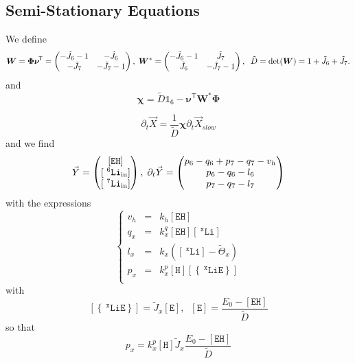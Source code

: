 \documentclass[aps,onecolumn,12pt]{revtex4}
\newcommand{\mychem}[1]{\mathtt{#1}}
\newcommand{\myconc}[1]{\left\lbrack{#1}\right\rbrack}
\newcommand{\spLi}[1]{{~^{\mychem{#1}}\mychem{Li}}}
\newcommand{\Li}[1]{\myconc{\spLi{#1}}}
\newcommand{\spEout}{\mychem{E}}
\newcommand{\Eout}{\myconc{\spEout}}
\newcommand{\spLiE}[1]{\left\lbrace\spLi{#1}\spEout\right\rbrace}
\newcommand{\LiE}[1]{\myconc{\spLiE{#1}}}
\newcommand{\spLiIn}[1]{{\spLi{#1}}_{\mathrm{in}}}
\newcommand{\LiIn}[1]{\myconc{\spLiIn{#1}}}
\newcommand{\spEHin}{\mychem{EH}}
\newcommand{\EHin}{\myconc{\spEHin}}
\newcommand{\spproton}{\mychem{H}}
\newcommand{\proton}{\myconc{\spproton}}
\newcommand{\mytrn}[1]{{#1}^{\!\mathsf{T}}}
\newcommand{\mymat}[1]{{\bm{#1}}}
\begin{document}
\subsection{Semi-Stationary Equations}
We define
\begin{equation}
	\mymat{W} = \mymat{\Phi}\mytrn{\mymat{\nu}} = \begin{pmatrix} -\tilde{J}_6-1 & -\tilde{J}_6 \cr -\tilde{J}_7 & -\tilde{J}_7-1\end{pmatrix}
	,\;\mymat{W}^\ast = \begin{pmatrix} -\tilde{J}_6-1 & \tilde{J}_7 \cr \tilde{J}_6 & -\tilde{J}_7-1\end{pmatrix}
	,\;\; \tilde{D} =\det(\mymat{W})=1+\tilde{J}_6+\tilde{J}_7.
\end{equation}
and
\begin{equation}
	\mymat{\chi} = \tilde{D}\mathds{1}_6-\mytrn{\mymat{\nu}}\mymat{W}^\ast\mymat{\Phi}
\end{equation}

\begin{equation}
	\partial_t\vec{X} = \dfrac{1}{\tilde{D}}
	\mymat{\chi} \partial_t\vec{X}_{slow}
\end{equation}
and we find
\begin{equation}
	\vec{Y} = \begin{pmatrix} \EHin \cr \LiIn{6} \cr \LiIn{7} \end{pmatrix}
	,\;\partial_t \vec{Y} = 
	\begin{pmatrix}
	p_6-q_6+p_7-q_7-v_h\\
	p_6-q_6-l_6\\
	p_7-q_7-l_7
	\end{pmatrix}
\end{equation}
with the expressions
\begin{equation}
\left\lbrace
	\begin{array}{rcl}
	v_h & = & k_h \EHin \\
	q_x & = & k_x^q \EHin \Li{x}  \\
	l_x & = & k_x  \left(\Li{x}- \tilde{\Theta}_x\right)\\
	p_x & = & k_x^p \proton \LiE{x}\\
	\end{array}
\right.
\end{equation}
with
\begin{equation}
	\LiE{x} = \tilde{J}_x \Eout,\;\;\Eout=\dfrac{E_0-\EHin}{\tilde{D}}
\end{equation}
so that
\begin{equation}
	p_x = k_x^p \proton  \tilde{J}_x \dfrac{E_0-\EHin}{\tilde{D}}
\end{equation}
\end{document}
